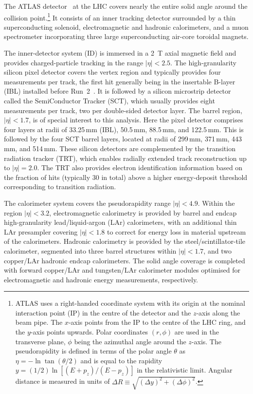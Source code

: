 \newcommand{\AtlasCoordFootnote}{%
ATLAS uses a right-handed coordinate system with its origin at the nominal interaction point (IP)
in the centre of the detector and the \(z\)-axis along the beam pipe.
The \(x\)-axis points from the IP to the centre of the LHC ring,
and the \(y\)-axis points upwards.
Polar coordinates \((r,\phi)\) are used in the transverse plane, 
\(\phi\) being the azimuthal angle around the \(z\)-axis.
The pseudorapidity is defined in terms of the polar angle \(\theta\) as \(\eta = -\ln \tan(\theta/2)\) and is equal to the rapidity
$y = (1/2) \ln [(E + p_z)/(E - p_z)]$ in the relativistic limit.
Angular distance is measured in units of \(\Delta R \equiv \sqrt{(\Delta y)^{2} + (\Delta\phi)^{2}}\).}

The ATLAS detector~\cite{PERF-2007-01} at the LHC covers nearly the entire solid angle around the collision point.\footnote{\AtlasCoordFootnote}
It consists of an inner tracking detector surrounded by a thin superconducting solenoid, electromagnetic and hadronic calorimeters,
and a muon spectrometer incorporating three large superconducting air-core toroidal magnets.

The inner-detector system (ID) is immersed in a \qty{2}{\tesla} axial magnetic field 
and provides charged-particle tracking in the range \(|\eta| < 2.5\).
The high-granularity silicon pixel detector covers the vertex region and typically provides four measurements per track, 
the first hit generally being in the insertable B-layer (IBL) installed before Run~2~\cite{ATLAS-TDR-19,PIX-2018-001}. 
It is followed by a silicon microstrip detector called the SemiConductor Tracker (SCT), which usually provides eight measurements per track, two per double-sided detector layer. The barrel region, $|\eta| < 1.7$, is of special interest to this analysis. Here the pixel detector comprises four layers at radii of 33.25\,mm (IBL), 50.5\,mm, 88.5\,mm, and 122.5\,mm. This is followed by the four SCT barrel layers, located at radii of 299\,mm, 371\,mm, 443\,mm, and 514\,mm. These silicon detectors are complemented by the transition radiation tracker (TRT),
which enables radially extended track reconstruction up to \(|\eta| = 2.0\). 
The TRT also provides electron identification information 
based on the fraction of hits (typically 30 in total) above a higher energy-deposit threshold corresponding to transition radiation.

The calorimeter system covers the pseudorapidity range \(|\eta| < 4.9\).
Within the region \(|\eta|< 3.2\), electromagnetic calorimetry is provided by barrel and 
endcap high-granularity lead/liquid-argon (LAr) calorimeters,
with an additional thin LAr presampler covering \(|\eta| < 1.8\)
to correct for energy loss in material upstream of the calorimeters.
Hadronic calorimetry is provided by the steel/scintillator-tile calorimeter,
segmented into three barrel structures within \(|\eta| < 1.7\), and two copper/LAr hadronic endcap calorimeters.
The solid angle coverage is completed with forward copper/LAr and tungsten/LAr calorimeter modules
optimised for electromagnetic and hadronic energy measurements, respectively.

